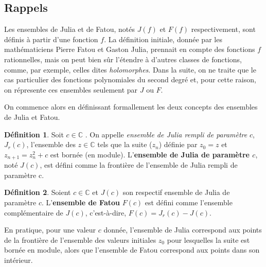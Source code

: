 \documentclass{article}
\theoremstyle{definition}
\newtheorem{definition}{Définition} [section]
\begin{document}
\subsection{Rappels}

Les ensembles de Julia et de Fatou, notés \(J(f)\) et \(F(f)\) respectivement,
sont définis à partir d'une fonction \(f\). La définition initiale, donnée par
les mathématiciens Pierre Fatou et Gaston Julia, prennait en compte des
fonctions \(f\) rationnelles, mais on peut bien sûr l'étendre à d'autres classes
de fonctions, comme, par exemple, celles dites \textit{holomorphes}. Dans la
suite, on ne traite que le cas particulier des fonctions polynomiales du second
degré et, pour cette raison, on répresente ces ensembles seulement par
\(J\) ou \(F\).

\vspace{12pt}

On commence alors en définissant formallement les deux concepts des ensembles de
Julia et Fatou.

\begin{definition}

Soit \(c \in  \mathbb{C}\) . On appelle \textit{ensemble de Julia rempli de
paramètre} \(c\), \(J_r(c)\), l’ensemble des \(z \in  \mathbb{C}\) tels que la
suite (\(z_n\)) définie par \(z_0 = z \) et \(z_{n+1} = z_n^2 + c \) est bornée (en
module). L’\textbf{ensemble de Julia de paramètre \(c\)}, noté \(J(c)\), est
défini comme la frontière de l’ensemble de Julia rempli de paramètre c.

\end{definition}

\begin{definition}

Soient \(c \in  \mathbb{C}\) et \(J(c)\) son respectif ensemble de Julia de
paramètre \(c\). L'\textbf{ensemble de Fatou} \(F(c)\) est défini comme
l'ensemble complémentaire de \(J(c)\), c'est-à-dire, \(F(c) = J_r(c) - J(c)\).

\end{definition}

En pratique, pour une valeur \(c\) donnée, l'ensemble de Julia correspond aux
points de la frontière de l'ensemble des valeurs initiales \(z_0\) pour
lesquelles la suite est bornée en module, alors que l'ensemble de Fatou
correspond aux points dans son intérieur.

\vspace{12pt}

\end{document}
